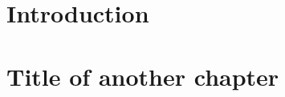 \documentclass[11pt, draft]{ucthesis}
\begin{document}
\begin{dissertationText}
\renewcommand{\baselinestretch}{1.66}

\chapter{Introduction}    %
	
\chapter{Title of another chapter}  %

\clearpage


\ssp	%



%	
%	
\end{dissertationText}
\end{document}
